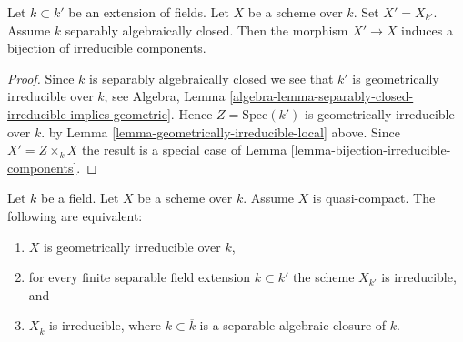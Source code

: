 \begin{lemma}
\label{lemma-separably-closed-field-irreducible-components}
Let $k \subset k'$ be an extension of fields.
Let $X$ be a scheme over $k$. Set $X' = X_{k'}$.
Assume $k$ separably algebraically closed.
Then the morphism $X' \to X$ induces a bijection of irreducible components.
\end{lemma}

\begin{proof}
Since $k$ is separably algebraically closed we see that
$k'$ is geometrically irreducible over $k$, see Algebra,
Lemma \ref{algebra-lemma-separably-closed-irreducible-implies-geometric}.
Hence $Z = \text{Spec}(k')$ is geometrically irreducible over $k$.
by Lemma \ref{lemma-geometrically-irreducible-local} above.
Since $X' = Z \times_k X$ the result is a special case
of Lemma \ref{lemma-bijection-irreducible-components}.
\end{proof}

\begin{lemma}
\label{lemma-characterize-geometrically-irreducible}
Let $k$ be a field. Let $X$ be a scheme over $k$.
Assume $X$ is quasi-compact. The following are equivalent:
\begin{enumerate}
\item $X$ is geometrically irreducible over $k$,
\item for every finite separable field extension $k \subset k'$
the scheme $X_{k'}$ is irreducible, and
\item $X_{\overline{k}}$ is irreducible, where $k \subset \overline{k}$
is a separable algebraic closure of $k$.
\end{enumerate}
\end{lemma}

